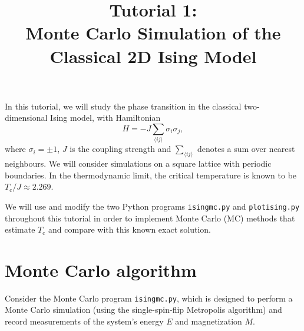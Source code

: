 \documentclass[letterpaper]{scrartcl}
\begin{document}


\title{Tutorial 1: \\ Monte Carlo Simulation of the \\ Classical 2D Ising Model}

\maketitle



In this tutorial, we will study the phase transition in the classical two-dimensional Ising model, with Hamiltonian
\begin{equation*}
H = -J \sum_{\langle ij \rangle} \sigma_i \sigma_j, 
\end{equation*}
where $\sigma_i = \pm 1$, $J$ is the coupling strength and $\sum_{\langle ij \rangle}$ denotes a sum over nearest neighbours.
We will consider simulations on a square lattice with periodic boundaries.
In the thermodynamic limit, the critical temperature is known to be ${ T_\text{c} }/{J} \approx 2.269$.

We will use and modify the two Python programs \texttt{ising{\textunderscore}mc.py} and \texttt{plot{\textunderscore}ising.py} throughout this tutorial 
in order to implement Monte Carlo (MC) methods that estimate $T_\text{c}$ and compare with this known exact solution.

\section{Monte Carlo algorithm}
Consider the Monte Carlo program \texttt{ising{\textunderscore}mc.py}, which is designed to perform a Monte Carlo simulation (using the single-spin-flip Metropolis algorithm) and record measurements of the system's energy $E$ and magnetization $M$. 
\end{document}
